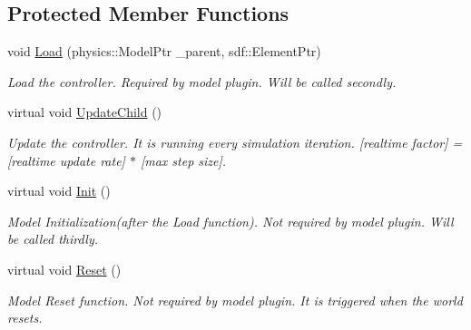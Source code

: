 \subsection*{Protected Member Functions}
\begin{DoxyCompactItemize}
\item 
void \hyperlink{classgazebo_1_1NubotGazebo_aa1eea79757774a935fe82a5fbc1b3f94}{Load} (physics\-::\-Model\-Ptr \-\_\-parent, sdf\-::\-Element\-Ptr)
\begin{DoxyCompactList}\small\item\em Load the controller. Required by model plugin. Will be called secondly. \end{DoxyCompactList}\item 
virtual void \hyperlink{classgazebo_1_1NubotGazebo_a9d2bb8130da6d209089f5ee469427ca4}{Update\-Child} ()
\begin{DoxyCompactList}\small\item\em Update the controller. It is running every simulation iteration. \mbox{[}realtime factor\mbox{]} = \mbox{[}realtime update rate\mbox{]} $\ast$ \mbox{[}max step size\mbox{]}. \end{DoxyCompactList}\item 
virtual void \hyperlink{classgazebo_1_1NubotGazebo_abf91360d6ce9b5f2cf02c3907100495e}{Init} ()
\begin{DoxyCompactList}\small\item\em Model Initialization(after the Load function). Not required by model plugin. Will be called thirdly. \end{DoxyCompactList}\item 
virtual void \hyperlink{classgazebo_1_1NubotGazebo_aefa336771bb8dffca92a2919352b62bc}{Reset} ()
\begin{DoxyCompactList}\small\item\em Model Reset function. Not required by model plugin. It is triggered when the world resets. \end{DoxyCompactList}\end{DoxyCompactItemize}

